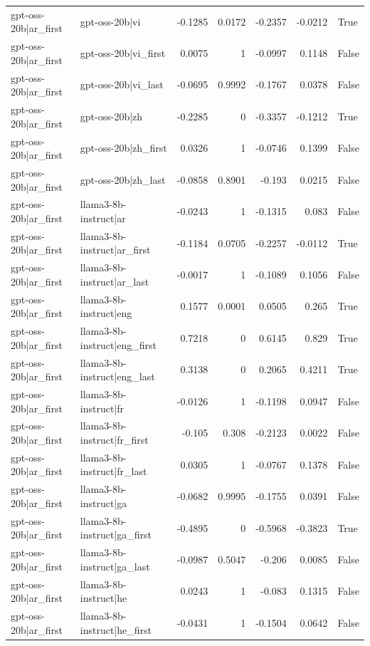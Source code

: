 \begin{table}
\begin{tabular}{l l r r r r l}
gpt-oss-20b|ar_first & gpt-oss-20b|vi & -0.1285 & 0.0172 & -0.2357 & -0.0212 & True \\
gpt-oss-20b|ar_first & gpt-oss-20b|vi_first & 0.0075 & 1 & -0.0997 & 0.1148 & False \\
gpt-oss-20b|ar_first & gpt-oss-20b|vi_last & -0.0695 & 0.9992 & -0.1767 & 0.0378 & False \\
gpt-oss-20b|ar_first & gpt-oss-20b|zh & -0.2285 & 0 & -0.3357 & -0.1212 & True \\
gpt-oss-20b|ar_first & gpt-oss-20b|zh_first & 0.0326 & 1 & -0.0746 & 0.1399 & False \\
gpt-oss-20b|ar_first & gpt-oss-20b|zh_last & -0.0858 & 0.8901 & -0.193 & 0.0215 & False \\
gpt-oss-20b|ar_first & llama3-8b-instruct|ar & -0.0243 & 1 & -0.1315 & 0.083 & False \\
gpt-oss-20b|ar_first & llama3-8b-instruct|ar_first & -0.1184 & 0.0705 & -0.2257 & -0.0112 & True \\
gpt-oss-20b|ar_first & llama3-8b-instruct|ar_last & -0.0017 & 1 & -0.1089 & 0.1056 & False \\
gpt-oss-20b|ar_first & llama3-8b-instruct|eng & 0.1577 & 0.0001 & 0.0505 & 0.265 & True \\
gpt-oss-20b|ar_first & llama3-8b-instruct|eng_first & 0.7218 & 0 & 0.6145 & 0.829 & True \\
gpt-oss-20b|ar_first & llama3-8b-instruct|eng_last & 0.3138 & 0 & 0.2065 & 0.4211 & True \\
gpt-oss-20b|ar_first & llama3-8b-instruct|fr & -0.0126 & 1 & -0.1198 & 0.0947 & False \\
gpt-oss-20b|ar_first & llama3-8b-instruct|fr_first & -0.105 & 0.308 & -0.2123 & 0.0022 & False \\
gpt-oss-20b|ar_first & llama3-8b-instruct|fr_last & 0.0305 & 1 & -0.0767 & 0.1378 & False \\
gpt-oss-20b|ar_first & llama3-8b-instruct|ga & -0.0682 & 0.9995 & -0.1755 & 0.0391 & False \\
gpt-oss-20b|ar_first & llama3-8b-instruct|ga_first & -0.4895 & 0 & -0.5968 & -0.3823 & True \\
gpt-oss-20b|ar_first & llama3-8b-instruct|ga_last & -0.0987 & 0.5047 & -0.206 & 0.0085 & False \\
gpt-oss-20b|ar_first & llama3-8b-instruct|he & 0.0243 & 1 & -0.083 & 0.1315 & False \\
gpt-oss-20b|ar_first & llama3-8b-instruct|he_first & -0.0431 & 1 & -0.1504 & 0.0642 & False \\

\end{tabular}
\end{table}
